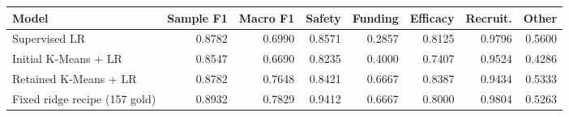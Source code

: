 \begin{tabular}{lrrrrrrr}
\toprule
Model & Sample F1 & Macro F1 & Safety & Funding & Efficacy & Recruit. & Other \\
\midrule
Supervised LR & 0.8782 & 0.6990 & 0.8571 & 0.2857 & 0.8125 & 0.9796 & 0.5600 \\
Initial K-Means + LR & 0.8547 & 0.6690 & 0.8235 & 0.4000 & 0.7407 & 0.9524 & 0.4286 \\
Retained K-Means + LR & 0.8782 & 0.7648 & 0.8421 & 0.6667 & 0.8387 & 0.9434 & 0.5333 \\
Fixed ridge recipe (157 gold) & 0.8932 & 0.7829 & 0.9412 & 0.6667 & 0.8000 & 0.9804 & 0.5263 \\
\bottomrule
\end{tabular}
